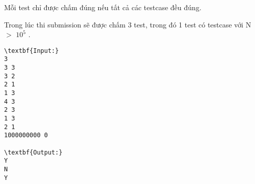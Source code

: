 Mỗi test chỉ được chấm đúng nếu tất cả các testcase đều đúng.

Trong lúc thi submission sẽ được chấm 3 test, trong đó 1 test có testcase với N $>$ $10^{5}$ .
\begin{verbatim}
\textbf{Input:}
3
3 3
3 2
2 1
1 3
4 3
2 3
1 3
2 1
1000000000 0

\textbf{Output:}
Y
N
Y\end{verbatim}